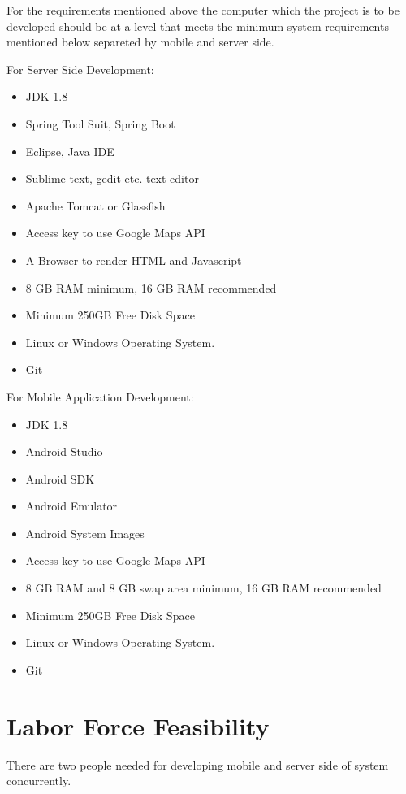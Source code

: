 For the requirements mentioned above the computer which the project is to be developed should be at a level that meets the minimum system requirements mentioned below separeted by mobile and server side.

For Server Side Development:
\begin{itemize}
    \item JDK 1.8
    \item Spring Tool Suit, Spring Boot
    \item Eclipse, Java IDE
    \item Sublime text, gedit etc. text editor
    \item Apache Tomcat or Glassfish
    \item Access key to use Google Maps API
    \item A Browser to render HTML and Javascript
    \item 8 GB RAM minimum, 16 GB RAM recommended
    \item Minimum 250GB Free Disk Space    
    \item Linux or Windows Operating System.
    \item Git
    
\end{itemize}

For Mobile Application Development:
\begin{itemize}
    \item JDK 1.8
    \item Android Studio
    \item Android SDK
    \item Android Emulator
    \item Android System Images
    \item Access key to use Google Maps API
    \item 8 GB RAM and 8 GB swap area minimum, 16 GB RAM recommended
    \item Minimum 250GB Free Disk Space
    \item Linux or Windows Operating System.
    \item Git    
\end{itemize}


\section{Labor Force Feasibility}
There are two people needed for developing mobile and server side of system concurrently.



